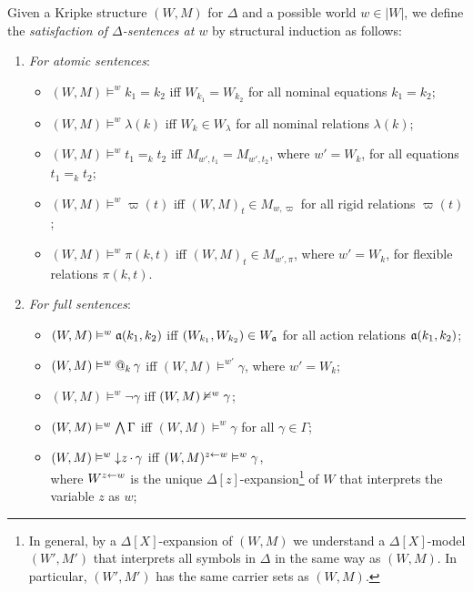 \documentclass[a4paper,UKenglish,cleveref,autoref]{lipics-v2019}
\begin{document}
Given a Kripke structure \((W, M)\) for \(\Delta\) and a possible world \(w \in |W|\), we define the \emph{satisfaction of \(\Delta\)-sentences at \(w\)} by structural induction as follows:
\begin{enumerate}

\item \emph{For atomic sentences}:
  \begin{itemize}

  \item \((W, M) \models^{w} k_{1} = k_{2}\) iff \(W_{k_{1}} = W_{k_{2}}\) for all nominal equations \(k_{1} = k_{2}\);

  \item \((W, M) \models^{w} \lambda(k)\) iff \(W_{k} \in W_{\lambda}\) for all nominal relations \(\lambda(k)\);

  \item \((W, M) \models^{w} t_{1} =_{k} t_{2}\) iff \(M_{w', t_{1}} = M_{w', t_{2}}\), where \(w' = W_{k}\), for all equations \(t_{1} =_{k} t_{2}\);

  \item \((W, M) \models^{w} \varpi(t)\) iff \((W, M)_t \in M_{w,\varpi}\) for all rigid relations \(\varpi(t)\);

  \item \((W, M) \models^{w} \pi(k, t)\) iff \((W, M)_t \in M_{w',\pi}\), where \(w' = W_{k}\), for flexible relations \(\pi(k, t)\).

  \end{itemize}

\item \emph{For full sentences}:
  \begin{itemize}

  \item \((W, M) \vDash^{w} \mathfrak{a}(k_{1}, k_{2})\) iff \((W_{k_{1}}, W_{k_{2}}) \in W_{\mathfrak{a}}\) for all action relations \(\mathfrak{a}(k_{1}, k_{2})\);

  \item \((W, M) \vDash^{w} @_{k}\, \gamma\) iff \((W, M) \models^{w'} \gamma\), where \(w' = W_{k}\);

  \item \((W, M) \models^{w} \neg \gamma\) iff \((W, M) \nvDash^{w} \gamma\);

  \item \((W, M) \vDash^{w} \textstyle\bigwedge \Gamma\) iff \((W, M) \models^{w} \gamma\) for all \(\gamma \in \Gamma\); 

  \item \((W, M) \vDash^{w} {\downarrow}z\,{\cdot}\,{\gamma}\) iff \((W, M)^{z \leftarrow w} \vDash^{w} \gamma\), \\
    where \(W^{z \leftarrow w}\) is the unique \(\Delta[z]\)-expansion\footnote{In general, by a \(\Delta[X]\)-expansion of \((W, M)\) we understand a \(\Delta[X]\)-model \((W', M')\) that interprets all symbols in \(\Delta\) in the same way as \((W, M)\). In particular, \((W', M')\) has the same carrier sets as \((W, M)\).} of \(W\) that interprets the variable \(z\) as \(w\);


\end{itemize}
\end{enumerate}
\end{document}
